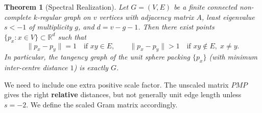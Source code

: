 \documentclass{article}
\newtheorem{theorem}{Theorem}[section]
\theoremstyle{definition}
\begin{document}
\begin{theorem}[Spectral Realization]
\label{thm:spectral-realization}
Let $G=(V,E)$ be a finite connected non-complete $k$-regular graph on $v$ vertices with adjacency matrix $A$, least eigenvalue $s<-1$ of multiplicity $g$, and $d=v-g-1$. Then there exist points $\{p_x : x\in V\}\subset \mathbb{R}^d$ such that
\[
  \|p_x-p_y\|=1\quad\text{if }xy\in E,
  \qquad
  \|p_x-p_y\|>1\quad\text{if }xy\notin E,\; x\neq y.
\]
In particular, the tangency graph of the unit sphere packing $\{p_x\}$ (with minimum inter-centre distance $1$) is exactly $G$.
\end{theorem}

We need to include one extra positive scale factor. The unscaled matrix $PMP$ gives the right \textbf{relative} distances, but not generally unit edge length unless $s=-2$. We define the scaled Gram matrix accordingly.
\end{document}
